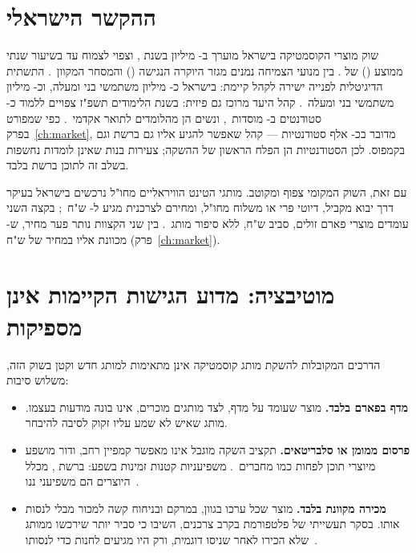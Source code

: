 \section{ההקשר הישראלי}
\label{sec:intro-israel}

שוק מוצרי הקוסמטיקה בישראל מוערך ב- מיליון בשנת , וצפוי
לצמוח עד  בשיעור שנתי ממוצע () של . בין מנועי
הצמיחה נמנים מגזר היוקרה הנגישה () והמסחר
המקוון~\cite{mordor2026israel}. התשתית הדיגיטלית לפנייה ישירה לקהל קיימת: בישראל
כ- מיליון משתמשי  בני  ומעלה, וכ- מיליון
משתמשי  בני  ומעלה~\cite{datareportal2026israel}. קהל היעד מרוכז גם
פיזית: בשנת הלימודים תשפ"ז צפויים ללמוד כ- סטודנטים ב-
מוסדות~\cite{che2026students}, ונשים הן  מהלומדים לתואר
אקדמי~\cite{cbs2024students}. כפי שמפורט בפרק~\ref{ch:market}, מדובר בכ-
אלף סטודנטיות --- קהל שאפשר להגיע אליו גם ברשת וגם בקמפוס. לכן הסטודנטיות הן
הפלח הראשון של ההשקה; צעירות בנות  שאינן לומדות נחשפות בשלב זה
לתוכן ברשת בלבד.

עם זאת, השוק המקומי צפוף ומקוטב. מותגי הטינט הוויראליים מחו"ל נרכשים בישראל בעיקר דרך
יבוא מקביל, דיוטי פרי או משלוח מחו"ל, ומחירם לצרכנית מגיע ל-
ש"ח~\cite{rhode2026terms,makeupstore2026rhode,caretobeauty2026benefit}; בקצה השני
עומדים מוצרי פארם זולים, סביב  ש"ח, ללא סיפור מותג~\cite{essence2026superpharm}.
בין שני הקצוות נותר פער מחיר, ש- מכוונת אליו במחיר של  ש"ח
(פרק~\ref{ch:market}).

\section{מוטיבציה: מדוע הגישות הקיימות אינן מספיקות}
\label{sec:intro-motivation}

הדרכים המקובלות להשקת מותג קוסמטיקה אינן מתאימות למותג חדש וקטן בשוק הזה, משלוש
סיבות:

\begin{itemize}
  \item \textbf{מדף בפארם בלבד.} מוצר שעומד על מדף, לצד מותגים מוכרים, אינו
    בונה מודעות בעצמו. מותג שאיש לא שמע עליו זקוק לסיבה להיבחר.
  \item \textbf{פרסום ממומן או סלבריטאים.} תקציב השקה מוגבל אינו מאפשר קמפיין
    רחב, ודור  מושפע מיוצרי תוכן לפחות כמו מחברים~\cite{meintjes2025genz}.
    משפיעניות קטנות זמינות בשפע: ברשת ,  מכלל
    היוצרים הם משפיעני ננו~\cite{hypeauditor2025state}.
  \item \textbf{מכירה מקוונת בלבד.} מוצר שכל ערכו בגוון, במרקם ובניחוח קשה למכור
    מבלי לנסות אותו. בסקר תעשייתי של פלטפורמת  בקרב 
    צרכנים,  השיבו כי סביר יותר שירכשו ממותג שלא הכירו לאחר שניסו
    דוגמית, ורק  היו מגיעים לחנות כדי לנסותו~\cite{cosmeticsbusiness2021sampling}.
\end{itemize}

